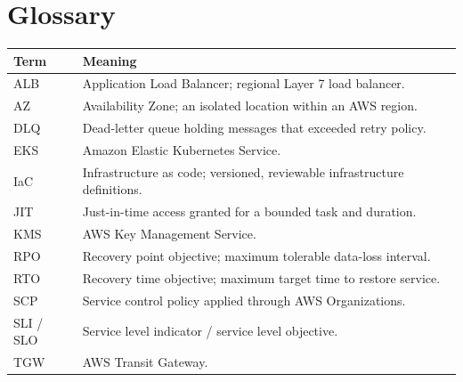 \section{Glossary}
\thispagestyle{fancy}

\begin{tabularx}{\textwidth}{@{}L{30mm}Y@{}}
  \toprule
  \color{white}\textbf{Term} & \color{white}\textbf{Meaning} \\
  \midrule
  ALB & Application Load Balancer; regional Layer 7 load balancer. \\
  AZ & Availability Zone; an isolated location within an AWS region. \\
  DLQ & Dead-letter queue holding messages that exceeded retry policy. \\
  EKS & Amazon Elastic Kubernetes Service. \\
  IaC & Infrastructure as code; versioned, reviewable infrastructure definitions. \\
  JIT & Just-in-time access granted for a bounded task and duration. \\
  KMS & AWS Key Management Service. \\
  RPO & Recovery point objective; maximum tolerable data-loss interval. \\
  RTO & Recovery time objective; maximum target time to restore service. \\
  SCP & Service control policy applied through AWS Organizations. \\
  SLI / SLO & Service level indicator / service level objective. \\
  TGW & AWS Transit Gateway. \\
  \bottomrule
\end{tabularx}

